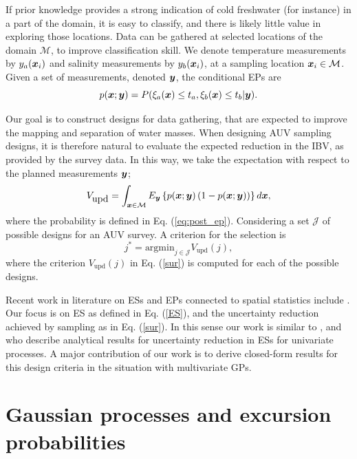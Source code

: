\documentclass[aoas]{imsart}
\begin{document}
If prior knowledge provides a strong indication of cold freshwater
(for instance) in a part of the domain, it is easy to classify, and
there is likely little value in exploring those locations. Data can be
gathered at selected locations of the domain $\mathcal{M}$, to improve
classification skill. We denote temperature measurements by
$y_{a}({\boldsymbol x}_i)$ and salinity measurements by $y_{b}({\boldsymbol x}_i)$, at a
sampling location ${\boldsymbol x}_i \in \mathcal{M}$. Given a set of
measurements, denoted ${\boldsymbol y}$, the conditional EPs are
\begin{equation}\label{eq:post_ep}
 p(\bx;\by) = P(\xi_a(\bx) \leq t_a, \xi_b(\bx) \leq t_b |\by). 
\end{equation}

Our goal is to construct designs for data gathering, that are expected
to improve the mapping and separation of water masses. When designing
AUV sampling designs, it is therefore natural to evaluate the expected
reduction in the IBV, as provided by the survey data. In this way, we
take the expectation with respect to the planned measurements ${\boldsymbol y}$;
\begin{equation}\label{sur}
    V_{\mbox{upd}} = \int_{\bx \in \mathcal{M}} E_{\by} \left\{ p(\bx;\by)\left( 1-p(\bx;\by)\right) \right\} d\bx, 
\end{equation}
where the probability is defined in Eq. (\ref{eq:post_ep}).
Considering a set $\mathcal{J}$ of possible designs for an AUV survey. A criterion for the selection is
\begin{equation}\label{crit}
    j^* = \mbox{argmin}_{j \in \mathcal{J}} V_{\mbox{upd}}(j),
\end{equation}
where the criterion $V_{\mbox{upd}}(j)$ in Eq. (\ref{sur}) is computed for each of the possible designs. 

Recent work in literature on ESs and EPs connected to spatial
statistics include
\cite{picheny2010,french2013spatio,bolin2015excursion,french2016credible}.
Our focus is on ES as defined in Eq. (\ref{ES}), and the uncertainty
reduction achieved by sampling as in Eq. (\ref{sur}). In this sense
our work is similar to \cite{bect2012}, \cite{chevalier2014fast} and
\cite{azzimonti2016quantifying} who describe analytical results for
uncertainty reduction in ESs for univariate processes. A major
contribution of our work is to derive closed-form results for this
design criteria in the situation with multivariate GPs.

\section{Gaussian processes and excursion probabilities}
\label{sec:GP_EP}
\end{document}
